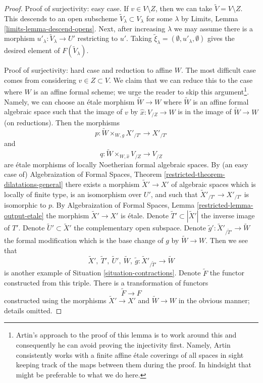 \documentclass{stacks-project}
\theoremstyle{plain}
\theoremstyle{definition}
\theoremstyle{remark}
\numberwithin{equation}{subsection}
\begin{document}
\begin{proof}
\medskip\noindent
Proof of surjectivity: easy case.
If $v \in V \setminus Z$, then we can take $\tilde V = V \setminus Z$.
This descends to an open subscheme $\tilde V_\lambda \subset V_\lambda$
for some $\lambda$ by Limits, Lemma
\ref{limits-lemma-descend-opens}.
Next, after increasing $\lambda$ we may assume
there is a morphism $u'_\lambda : \tilde V_\lambda \to U'$
restricting to $u'$. Taking
$\tilde \xi_\lambda = (\emptyset, u'_\lambda, \emptyset)$
gives the desired element of $F(\tilde V_\lambda)$.

\medskip\noindent
Proof of surjectivity: hard case and reduction to affine $W$.
The most difficult case comes from considering $v \in Z \subset V$.
We claim that we can reduce this to the case where $W$ is an
affine formal scheme; we urge the reader to skip this argument\footnote{Artin's
approach to the proof of this lemma is to work around this and
consequently he can avoid proving the injectivity first. Namely, Artin
consistently works with a finite affine \'etale coverings of all spaces
in sight keeping track of the maps between them during the proof.
In hindsight that might be preferable to what we do here.}.
Namely, we can choose an \'etale morphism
$\tilde W \to W$ where $\tilde W$ is an affine formal algebraic space
such that the image of $v$ by $\hat x : V_{/Z} \to W$ is
in the image of $\tilde W \to W$ (on reductions).
Then the morphisms
$$
p : \tilde W \times_{W, g} X'_{/T'} \longrightarrow X'_{/T'}
$$
and
$$
q : \tilde W \times_{W, \hat x} V_{/Z} \to V_{/Z}
$$
are \'etale morphisms of locally Noetherian formal algebraic spaces.
By (an easy case of) Algebraization of Formal Spaces, Theorem
\ref{restricted-theorem-dilatations-general}
there exists a morphism $\tilde X' \to X'$ of algebraic spaces
which is locally of finite type, is an isomorphism over $U'$, and
such that $\tilde X'_{/T'} \to X'_{/T'}$ is isomorphic to $p$.
By Algebraization of Formal Spaces, Lemma \ref{restricted-lemma-output-etale}
the morphism $\tilde X' \to X'$ is \'etale. Denote
$\tilde T' \subset |\tilde X'|$ the inverse image of $T'$.
Denote $\tilde U' \subset \tilde X'$ the complementary open subspace.
Denote $\tilde g' : \tilde X'_{/\tilde T'} \to \tilde W$
the formal modification which is the base change of $g$ by
$\tilde W \to W$. Then we see that
$$
\tilde X',\ \tilde T',\ \tilde U',\ \tilde W,
\ \tilde g : \tilde X'_{/\tilde T'} \to \tilde W
$$
is another example of Situation \ref{situation-contractions}.
Denote $\tilde F$ the functor constructed from this triple.
There is a transformation of functors
$$
\tilde F \longrightarrow F
$$
constructed using the morphisms $\tilde X' \to X'$ and
$\tilde W \to W$ in the obvious manner; details omitted.


\end{proof}
\end{document}
